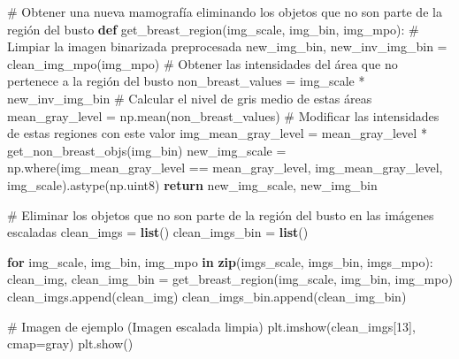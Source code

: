 \documentclass[
]{article}
\newenvironment{Shaded}{\begin{snugshade}}{\end{snugshade}}
\newcommand{\BuiltInTok}[1]{\textcolor[rgb]{0.39,0.29,0.61}{\textbf{#1}}}
\newcommand{\CommentTok}[1]{\textcolor[rgb]{0.54,0.53,0.53}{#1}}
\newcommand{\ControlFlowTok}[1]{\textcolor[rgb]{0.12,0.11,0.11}{\textbf{#1}}}
\newcommand{\DecValTok}[1]{\textcolor[rgb]{0.69,0.50,0.00}{#1}}
\newcommand{\KeywordTok}[1]{\textcolor[rgb]{0.12,0.11,0.11}{\textbf{#1}}}
\newcommand{\NormalTok}[1]{\textcolor[rgb]{0.12,0.11,0.11}{#1}}
\newcommand{\OperatorTok}[1]{\textcolor[rgb]{0.12,0.11,0.11}{#1}}
\newcommand{\StringTok}[1]{\textcolor[rgb]{0.75,0.01,0.01}{#1}}
\begin{document}
\begin{Shaded}
\begin{Highlighting}[]
\CommentTok{\# Obtener una nueva mamografía eliminando los objetos que no son parte de la región del busto}
\KeywordTok{def}\NormalTok{ get\_breast\_region(img\_scale, img\_bin, img\_mpo):}
    \CommentTok{\# Limpiar la imagen binarizada preprocesada}
\NormalTok{    new\_img\_bin, new\_inv\_img\_bin }\OperatorTok{=}\NormalTok{ clean\_img\_mpo(img\_mpo)}
    \CommentTok{\# Obtener las intensidades del área que no pertenece a la región del busto}
\NormalTok{    non\_breast\_values }\OperatorTok{=}\NormalTok{ img\_scale }\OperatorTok{*}\NormalTok{ new\_inv\_img\_bin}
    \CommentTok{\# Calcular el nivel de gris medio de estas áreas}
\NormalTok{    mean\_gray\_level }\OperatorTok{=}\NormalTok{ np.mean(non\_breast\_values)}
    \CommentTok{\# Modificar las intensidades de estas regiones con este valor}
\NormalTok{    img\_mean\_gray\_level }\OperatorTok{=}\NormalTok{ mean\_gray\_level }\OperatorTok{*}\NormalTok{ get\_non\_breast\_objs(img\_bin)}
\NormalTok{    new\_img\_scale }\OperatorTok{=}\NormalTok{ np.where(img\_mean\_gray\_level }\OperatorTok{==}\NormalTok{ mean\_gray\_level, img\_mean\_gray\_level, img\_scale).astype(np.uint8)}
    \ControlFlowTok{return}\NormalTok{ new\_img\_scale, new\_img\_bin}
\end{Highlighting}
\end{Shaded}

\begin{Shaded}
\begin{Highlighting}[]
\CommentTok{\# Eliminar los objetos que no son parte de la región del busto en las imágenes escaladas}
\NormalTok{clean\_imgs }\OperatorTok{=} \BuiltInTok{list}\NormalTok{()}
\NormalTok{clean\_imgs\_bin }\OperatorTok{=} \BuiltInTok{list}\NormalTok{()}

\ControlFlowTok{for}\NormalTok{ img\_scale, img\_bin, img\_mpo }\KeywordTok{in} \BuiltInTok{zip}\NormalTok{(imgs\_scale, imgs\_bin, imgs\_mpo):}
\NormalTok{    clean\_img, clean\_img\_bin }\OperatorTok{=}\NormalTok{ get\_breast\_region(img\_scale, img\_bin, img\_mpo)}
\NormalTok{    clean\_imgs.append(clean\_img)}
\NormalTok{    clean\_imgs\_bin.append(clean\_img\_bin)}
\end{Highlighting}
\end{Shaded}

\begin{Shaded}
\begin{Highlighting}[]
\CommentTok{\# Imagen de ejemplo (Imagen escalada limpia)}
\NormalTok{plt.imshow(clean\_imgs[}\DecValTok{13}\NormalTok{], cmap}\OperatorTok{=}\StringTok{\textquotesingle{}gray\textquotesingle{}}\NormalTok{)}
\NormalTok{plt.show()}
\end{Highlighting}
\end{Shaded}
\end{document}
